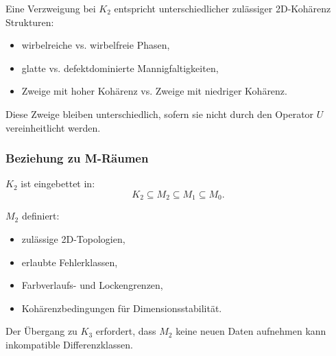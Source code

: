 Eine Verzweigung bei $K_2$ entspricht unterschiedlicher zulässiger 2D-Kohärenz
Strukturen:
\begin{itemize}
    \item wirbelreiche vs. wirbelfreie Phasen,
    \item glatte vs. defektdominierte Mannigfaltigkeiten,
    \item Zweige mit hoher Kohärenz vs. Zweige mit niedriger Kohärenz.
\end{itemize}

Diese Zweige bleiben unterschiedlich, sofern sie nicht durch den Operator $U$ vereinheitlicht werden.

\subsubsection{Beziehung zu M-Räumen}

$K_2$ ist eingebettet in:
\[
K_2 \subseteq M_2 \subseteq M_1 \subseteq M_0.
\]

$M_2$ definiert:
\begin{itemize}
    \item zulässige 2D-Topologien,
    \item erlaubte Fehlerklassen,
    \item Farbverlaufs- und Lockengrenzen,
    \item Kohärenzbedingungen für Dimensionsstabilität.
\end{itemize}

Der Übergang zu $K_3$ erfordert, dass $M_2$ keine neuen Daten aufnehmen kann
inkompatible Differenzklassen.

